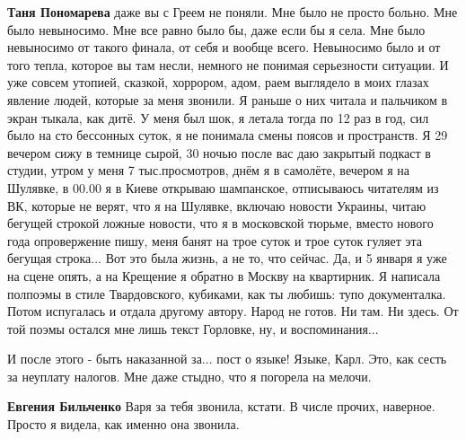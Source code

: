 \begin{itemize}
\begin{itemize}
 
\textbf{Таня Пономарева} даже вы с Греем не поняли. Мне было не просто больно.
Мне было невыносимо. Мне все равно было бы, даже если бы я села. Мне было
невыносимо от такого финала, от себя и вообще всего. Невыносимо было и от того
тепла, которое вы там несли, немного не понимая серьезности ситуации. И уже
совсем утопией, сказкой, хоррором, адом, раем выглядело в моих глазах явление
людей, которые за меня звонили. Я раньше о них читала и пальчиком в экран
тыкала, как дитё. У меня был шок, я летала тогда по 12 раз в год, сил было на
сто бессонных суток, я не понимала смены поясов и пространств. Я 29 вечером
сижу в темнице сырой, 30 ночью после вас даю закрытый подкаст в студии, утром у
меня 7 тыс.просмотров, днём я в самолёте, вечером я на Шулявке, в 00.00 я в
Киеве открываю шампанское, отписываюсь читателям из ВК, которые не верят, что я
на Шулявке, включаю новости Украины, читаю бегущей строкой ложные новости, что
я в московской тюрьме, вместо нового года опровержение пишу, меня банят на трое
суток и трое суток гуляет эта бегущая строка... Вот это была жизнь, а не то,
что сейчас. Да, и 5 января я уже на сцене опять, а на Крещение я обратно в
Москву на квартирник. Я написала полпоэмы в стиле Твардовского, кубиками, как
ты любишь: тупо документалка. Потом испугалась и отдала другому автору. Народ
не готов.  Ни там. Ни здесь. От той поэмы остался мне лишь текст Горловке, ну,
и воспоминания...

 
И после этого - быть наказанной за... пост о языке! Языке, Карл. Это, как сесть
за неуплату налогов. Мне даже стыдно, что я погорела на мелочи.

 
\textbf{Евгения Бильченко} Варя за тебя звонила, кстати. В числе прочих, наверное. Просто я видела, как именно она звонила.


\end{itemize}
\end{itemize}
